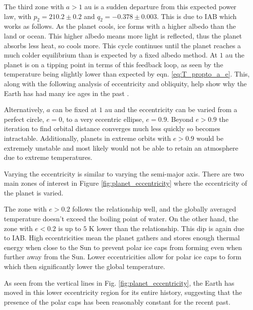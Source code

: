 \documentclass[12pt, onecolumn]{revtex4-2}    %
\begin{document}
The third zone with $a > 1$ au is a sudden departure from this expected power law, with $p_2 = 210.2 \pm 0.2$ and $q_2 = -0.378 \pm 0.003$.
This is due to IAB which works as follows.
As the planet cools, ice forms with a higher albedo than the land or ocean.
This higher albedo means more light is reflected, thus the planet absorbs less heat, so cools more.
This cycle continues until the planet reaches a much colder equilibrium than is expected by a fixed albedo method.
At $1$ au the planet is on a tipping point in terms of this feedback loop, as seen by the temperature being slightly lower than expected by eqn. \eqref{eq:T_propto_a_e}.
This, along with the following analysis of eccentricity and obliquity, help show why the Earth has had many ice ages in the past \cite{Emiliani78}.

Alternatively, $a$ can be fixed at $1$ au and the eccentricity can be varied from a perfect circle, $e = 0$, to a very eccentric ellipse, $e = 0.9$.
Beyond $e > 0.9$ the iteration to find orbital distance converges much less quickly so becomes intractable.
Additionally, planets in extreme orbits with $e > 0.9$ would be extremely unstable and most likely would not be able to retain an atmosphere due to extreme temperatures.

Varying the eccentricity is similar to varying the semi-major axis.
There are two main zones of interest in Figure \ref{fig:planet_eccentricity} where the eccentricity of the planet is varied.

The zone with $e > 0.2$ follows the relationship well, and the globally averaged temperature doesn't exceed the boiling point of water.
On the other hand, the zone with $e < 0.2$ is up to $5$ K lower than the relationship.
This dip is again due to IAB.
High eccentricities mean the planet gathers and stores enough thermal energy when close to the Sun to prevent polar ice caps from forming even when further away from the Sun.
Lower eccentricities allow for polar ice caps to form which then significantly lower the global temperature.

As seen from the vertical lines in Fig. \ref{fig:planet_eccentricity}, the Earth has moved in this lower eccentricity region for its entire history, suggesting that the presence of the polar caps has been reasonably constant for the recent past.
\end{document}
